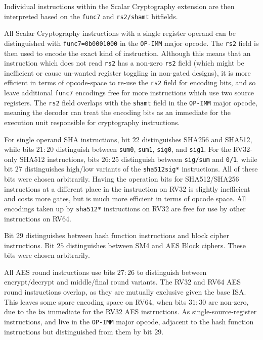 Individual instructions within the Scalar Cryptography extension
are then interpreted based on the {\tt func7} and {\tt rs2/shamt} bitfields.

All Scalar Cryptography instructions with a single register operand can be
distinguished with {\tt func7=0b0001000} in the {\tt OP-IMM} major opcode.
The {\tt rs2} field is then used to encode the exact kind of instruction.
Although this means that an instruction which does not read {\tt rs2} has
a non-zero {\tt rs2} field (which might be inefficient or cause un-wanted
register toggling in non-gated designs),
it is more efficient in terms of opcode-space to re-use the {\tt rs2} field
for encoding bits, and
so leave additional {\tt func7} encodings free for more instructions which
use two source registers.
The {\tt rs2} field overlaps with the {\tt shamt} field in the {\tt OP-IMM}
major opcode, meaning the decoder can treat the encoding bits as an
immediate for the execution unit responsible for cryptography
instructions.

For single operand SHA instructions,
bit $22$ distinguishes SHA256 and SHA512, while
bits $21:20$ distinguish between
{\tt sum0},
{\tt sum1},
{\tt sig0},
and
{\tt sig1}.
For the RV32-only SHA512 instructions,
bits $26:25$ distinguish between {\tt sig/sum} and {\tt 0/1},
while bit $27$ distinguishes high/low variants of the {\tt sha512sig*}
instructions.
All of these bits were chosen arbitrarily.
Having the operation bits for SHA512/SHA256 instructions at a different place
in the instruction on RV32 is slightly inefficient and costs more gates,
but is much more efficient in terms of opcode space.
All encodings taken up by {\tt sha512*} instructions on RV32 are
free for use by other instructions on RV64.

Bit $29$ distinguishes between hash function instructions and block
cipher instructions.
Bit $25$ distinguishes between SM4 and AES Block ciphers.
These bits were chosen arbitrarily.

All AES round instructions use bits $27:26$ to distinguish between
encrypt/decrypt and middle/final round variants.
The RV32 and RV64 AES round instructions overlap, as they are mutually
exclusive given the base ISA.
This leaves some spare encoding space on RV64, when bits $31:30$
are non-zero, due to the {\tt bs} immediate for the RV32 AES instructions.
As single-source-register instructions,
 and 
live in the {\tt OP-IMM} major opcode, adjacent to the hash function
instructions but distinguished from them by bit $29$.

